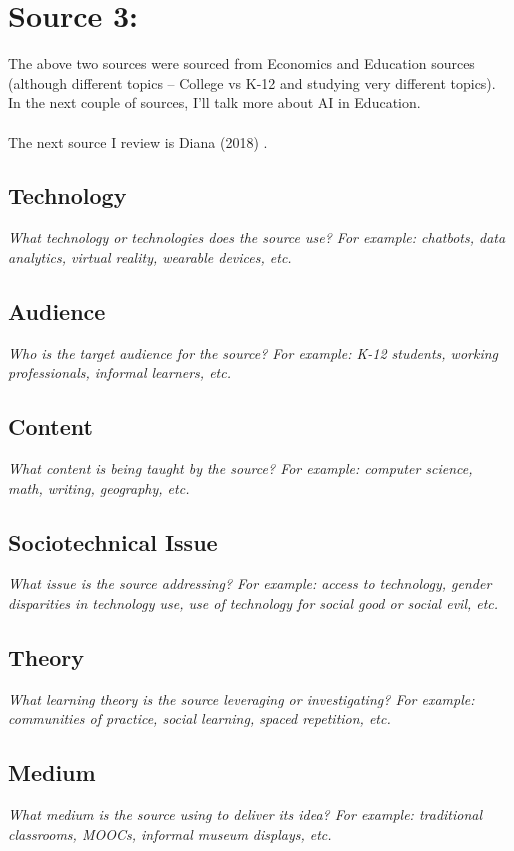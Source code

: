 \documentclass[12pt, final]{article}
\begin{document}
\section{Source 3: } \label{Source 3}
The above two sources were sourced from Economics and Education sources (although different topics -- College vs K-12 and studying very different topics). In the next couple of sources, I'll talk more about AI in Education. 
\\
\\
The next source I review is Diana (2018) \cite{Diana}. 

\subsection{Technology}
\textit{What technology or technologies does the source use? For example: chatbots, data analytics, virtual reality, wearable devices, etc.}

\subsection{Audience}
\textit{Who is the target audience for the source? For example: K-12 students, working professionals, informal learners, etc.}

\subsection{Content}
\textit{What content is being taught by the source? For example: computer science, math, writing, geography, etc.}

\subsection{Sociotechnical Issue}
\textit{What issue is the source addressing? For example: access to technology, gender disparities in technology use, use of technology for social good or social evil, etc.}

\subsection{Theory}
\textit{What learning theory is the source leveraging or investigating? For example: communities of practice, social learning, spaced repetition, etc.}

\subsection{Medium}
\textit{What medium is the source using to deliver its idea? For example: traditional classrooms, MOOCs, informal museum displays, etc.}
\end{document}
